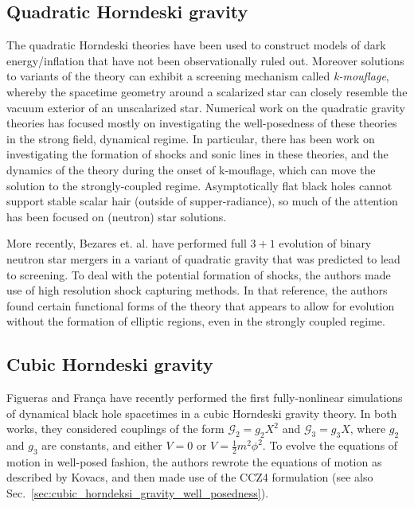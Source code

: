 \documentclass{ws-ijmpd}
\begin{document}
\subsection{Quadratic Horndeski gravity
\label{sec:quadratic_horndeski_numerical}}
The quadratic Horndeski theories have been used to construct models of 
dark energy/inflation\cite{Armendariz-Picon:2000nqq,
Armendariz-Picon:2000ulo} 
that have not been observationally 
ruled out\cite{Baker:2017hug,Creminelli:2018xsv,Creminelli:2019kjy}.
Moreover solutions to 
variants of the theory can 
exhibit a screening mechanism\cite{Joyce:2014kja} called
\emph{k-mouflage}\cite{Babichev:2009ee}, whereby
the spacetime geometry around a scalarized star 
can closely resemble the vacuum exterior of an unscalarized star.
Numerical work on the quadratic gravity theories has focused
mostly on investigating the well-posedness of these theories
in the strong field, dynamical 
regime\cite{Bernard:2019fjb,Bezares:2020wkn,Lara:2021piy}.
In particular, there has been work on investigating the
formation of shocks and sonic lines in these theories,
and the dynamics of the theory during the onset of
k-mouflage\cite{terHaar:2020xxb,
Bezares:2021yek,Dima:2021pwx}, 
which can move the solution to the strongly-coupled regime. 
Asymptotically flat black holes cannot support stable scalar hair 
(outside of supper-radiance)\cite{Graham:2014mda},
so much of the attention has been focused on (neutron) star solutions.

More recently, Bezares et. al.\cite{Bezares:2021dma} have performed
full $3+1$ evolution of binary neutron star mergers in a variant
of quadratic gravity that was predicted to lead to screening.
To deal with the potential formation of shocks, the authors
made use of high resolution shock capturing methods.
In that reference, the authors found certain functional forms
of the theory that appears to allow 
for evolution without the formation
of elliptic regions, even in the strongly coupled regime.
\subsection{Cubic Horndeski gravity
\label{sec:cubic_horndeski_numerical}}
Figueras and Fran\c{c}a\cite{Figueras:2020dzx,Figueras:2021abd}
have recently performed the first fully-nonlinear simulations
of dynamical black hole spacetimes in a cubic Horndeski gravity theory.
In both works, they considered couplings of the form
$\mathcal{G}_2=g_2X^2$ and $\mathcal{G}_3=g_3X$, where $g_2$ and
$g_3$ are constants, and either $V=0$\cite{Figueras:2020dzx}
or $V=\frac{1}{2}m^2\phi^2$\cite{Figueras:2021abd}. 
To evolve the equations of motion in well-posed fashion,
the authors rewrote the equations of motion as
described by Kovacs\cite{Kovacs:2019jqj}, and then made
use of the CCZ4 formulation\cite{Bona:2003fj,Alic:2011gg} 
(see also Sec.~\ref{sec:cubic_horndeksi_gravity_well_posedness}).
\end{document}
